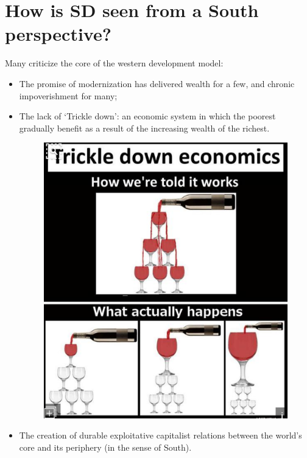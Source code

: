 \section{How is SD seen from a South perspective?}
Many criticize the core of the western development model:
\begin{itemize}
\item The promise of modernization has delivered wealth for a few, and chronic impoverishment for many;
\item The lack of ‘Trickle down’: an economic system in which the poorest gradually benefit as a result of the increasing wealth of the richest.
\begin{figure}[ht]
\begin{center}
\includegraphics[scale=0.6]{Trickledown}
\end{center}
\end{figure}
\item The creation of durable exploitative capitalist relations between the world’s core and its periphery (in the sense of South).
\end{itemize}

